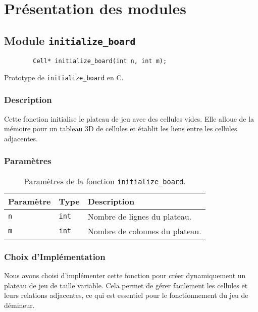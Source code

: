 \chapter{Présentation des modules}
\label{chap:presentation-modules}

\section{Module \texttt{initialize\_board}}

\begin{listing}[!htpb]
    \begin{verbatim}
        Cell* initialize_board(int n, int m);
    \end{verbatim}
    \caption{Prototype de \texttt{initialize\_board} en C.}
    \label{listing:c-initialize_board-prototype}
\end{listing}

\subsection{Description}

Cette fonction initialise le plateau de jeu avec des cellules vides. Elle alloue de la mémoire pour un tableau 3D de cellules et établit les liens entre les cellules adjacentes.
\newline\newline
\subsection{Paramètres}

\begin{table}[!htpb]
    \label{tab:parameters-initialize_board}
    \begin{tabularx}{\textwidth}{lXX}
        \toprule
        \textbf{Paramètre} & \textbf{Type} & \textbf{Description} \\
        \midrule
        \texttt{n} & \texttt{int} & Nombre de lignes du plateau. \\
        \texttt{m} & \texttt{int} & Nombre de colonnes du plateau. \\
        \bottomrule
    \end{tabularx}
    \caption{Paramètres de la fonction \texttt{initialize\_board}.}
\end{table}

\subsection{Choix d'Implémentation}
Nous avons choisi d'implémenter cette fonction pour créer dynamiquement un plateau de jeu de taille variable. 
Cela permet de gérer facilement les cellules et leurs relations adjacentes, ce qui est essentiel pour le fonctionnement du jeu de démineur.


